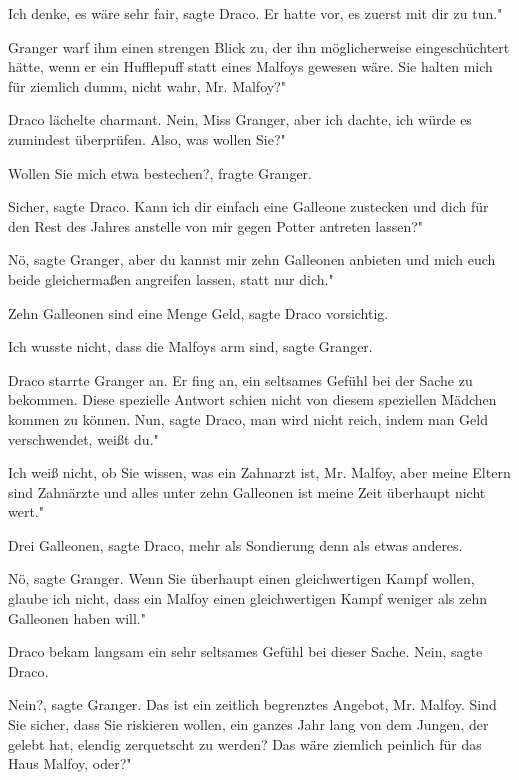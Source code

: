 \glqq Ich denke, es wäre sehr fair\grqq{}, sagte Draco. \glqq Er hatte vor, es
zuerst mit dir zu tun."

Granger warf ihm einen strengen Blick zu, der ihn möglicherweise eingeschüchtert
hätte, wenn er ein Hufflepuff statt eines Malfoys gewesen wäre. \glqq Sie halten
mich für ziemlich dumm, nicht wahr, Mr. Malfoy?"

Draco lächelte charmant. \glqq Nein, Miss Granger, aber ich dachte, ich würde es
zumindest überprüfen. Also, was wollen Sie?"

\glqq Wollen Sie mich etwa bestechen?\grqq{}, fragte Granger.

\glqq Sicher\grqq{}, sagte Draco. \glqq Kann ich dir einfach eine Galleone
zustecken und dich für den Rest des Jahres anstelle von mir gegen Potter
antreten lassen?"

\glqq Nö\grqq{}, sagte Granger, \glqq aber du kannst mir zehn Galleonen anbieten
und mich euch beide gleichermaßen angreifen lassen, statt nur dich."

\glqq Zehn Galleonen sind eine Menge Geld\grqq{}, sagte Draco vorsichtig.

\glqq Ich wusste nicht, dass die Malfoys arm sind\grqq{}, sagte Granger.

Draco starrte Granger an. Er fing an, ein seltsames Gefühl bei der Sache zu
bekommen. Diese spezielle Antwort schien nicht von diesem speziellen Mädchen
kommen zu können. \glqq Nun\grqq{}, sagte Draco, \glqq man wird nicht reich,
indem man Geld verschwendet, weißt du."

\glqq Ich weiß nicht, ob Sie wissen, was ein Zahnarzt ist, Mr. Malfoy, aber
meine Eltern sind Zahnärzte und alles unter zehn Galleonen ist meine Zeit
überhaupt nicht wert."

\glqq Drei Galleonen\grqq{}, sagte Draco, mehr als Sondierung denn als etwas
anderes.

\glqq Nö\grqq{}, sagte Granger. \glqq Wenn Sie überhaupt einen gleichwertigen
Kampf wollen, glaube ich nicht, dass ein Malfoy einen gleichwertigen Kampf
weniger als zehn Galleonen haben will."

Draco bekam langsam ein sehr seltsames Gefühl bei dieser Sache. \glqq
Nein\grqq{}, sagte Draco.

\glqq Nein?\grqq{}, sagte Granger. \glqq Das ist ein zeitlich begrenztes
Angebot, Mr. Malfoy. Sind Sie sicher, dass Sie riskieren wollen, ein ganzes Jahr
lang von dem Jungen, der gelebt hat, elendig zerquetscht zu werden? Das wäre
ziemlich peinlich für das Haus Malfoy, oder?"


